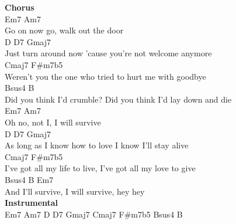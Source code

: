 \documentclass[a4paper]{article}
\begin{document}
{{        }
        \textbf{Chorus}
        ~\\
        {
            \cutive
            \obeyspaces
          Em7             Am7
\\
Go on now go, walk out the door
\\
          D         D7                 Gmaj7
\\
Just turn around now 'cause you're not welcome anymore
\\
Cmaj7                            F\#m7b5
\\
Weren't you the one who tried to hurt me with goodbye
\\
              Bsus4                      B
\\
Did you think I'd crumble? Did you think I'd lay down and die
\\
           Em7          Am7
\\
Oh no, not I, I will survive
\\
   D              D7             Gmaj7
\\
As long as I know how to love I know I'll stay alive
\\
         Cmaj7                         F\#m7b5
\\
I've got all my life to live, I've got all my love to give
\\
            Bsus4           B          Em7
\\
And I'll survive, I will survive, hey hey
\\

        }
        \textbf{Instrumental}
        ~\\
        {
            \cutive
            \obeyspaces
Em7   Am7    D    D7    Gmaj7    Cmaj7    F\#m7b5   Bsus4  B
\\

}}
\end{document}

